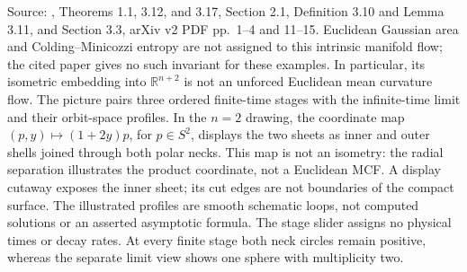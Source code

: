 \begin{example}
Source: \cite{CatCS25Man}, Theorems 1.1, 3.12, and 3.17, Section 2.1, Definition 3.10 and Lemma 3.11, and Section 3.3, arXiv v2 PDF pp.~1--4 and 11--15. Euclidean Gaussian area and Colding--Minicozzi entropy are not assigned to this intrinsic manifold flow; the cited paper gives no such invariant for these examples. In particular, its isometric embedding into $\mathbb R^{n+2}$ is not an unforced Euclidean mean curvature flow. The picture pairs three ordered finite-time stages with the infinite-time limit and their orbit-space profiles. In the $n=2$ drawing, the coordinate map $(p,y)\mapsto(1+2y)p$, for $p\in S^2$, displays the two sheets as inner and outer shells joined through both polar necks. This map is not an isometry: the radial separation illustrates the product coordinate, not a Euclidean MCF. A display cutaway exposes the inner sheet; its cut edges are not boundaries of the compact surface. The illustrated profiles are smooth schematic loops, not computed solutions or an asserted asymptotic formula. The stage slider assigns no physical times or decay rates. At every finite stage both neck circles remain positive, whereas the separate limit view shows one sphere with multiplicity two.
\end{example}

